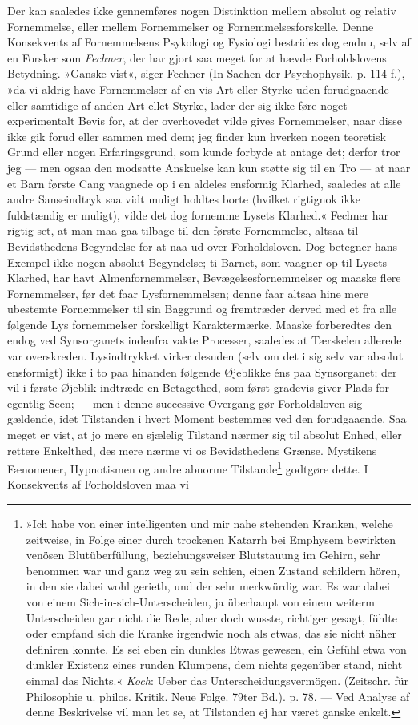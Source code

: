 \documentclass[12pt,a4paper,openany]{book}
\newcommand{\opage}[1]{\marginnote{\footnotesize\textit{[#1]}}}
\begin{document}
Der kan saaledes ikke gennemføres nogen Distinktion mellem absolut og
relativ Fornemmelse, eller mellem Fornemmelser og Fornemmelsesforskelle.
Denne Konsekvents af Fornemmelsens Psykologi og Fysiologi bestrides dog
endnu, selv af en Forsker som \emph{Fechner}, der har gjort saa meget
for at hævde Forholdslovens Betydning. »Ganske vist«, siger Fechner (In
Sachen der Psychophysik. p. 114 f.), »da vi aldrig have Fornemmelser af
en vis Art eller Styrke uden forudgaaende eller samtidige af anden Art
ellet Styrke, lader der sig ikke føre noget experimentalt Bevis for, at
der overhovedet vilde gives Fornemmelser, naar disse ikke gik forud
eller sammen med dem; jeg finder kun hverken nogen teoretisk Grund eller
nogen Erfaringsgrund, som kunde forbyde at antage det; derfor tror jeg
--- men ogsaa den modsatte Anskuelse kan kun støtte sig til en Tro ---
at naar et Barn første Cang vaagnede op i en aldeles ensformig Klarhed,
saaledes at alle andre Sanseindtryk saa vidt muligt holdtes borte
(hvilket rigtignok ikke fuldstændig er muligt), vilde det dog fornemme
Lysets Klarhed.« Fechner har rigtig set, at man maa gaa tilbage til den
første Fornemmelse, altsaa til Bevidsthedens Begyndelse for at naa ud
over Forholdsloven. Dog betegner hans Exempel ikke nogen absolut
Begyndelse; ti Barnet, som vaagner op til Lysets Klarhed, har havt
Almenfornemmelser, Bevægelsesfornemmelser og maaske flere Fornemmelser,
før det faar Lysfornemmelsen; denne faar altsaa hine mere ubestemte
Fornemmelser til sin Baggrund og fremtræder derved med et fra alle
følgende Lys%
\opage{143}fornemmelser forskelligt Karaktermærke. Maaske forberedtes
den endog ved Synsorganets indenfra vakte Processer, saaledes at
Tærskelen allerede var overskreden. Lysindtrykket virker desuden (selv
om det i sig selv var absolut ensformigt) ikke i to paa hinanden
følgende Øjeblikke éns paa Synsorganet; der vil i første Øjeblik
indtræde en Betagethed, som først gradevis giver Plads for egentlig
Seen; --- men i denne successive Overgang gør Forholdsloven sig
gældende, idet Tilstanden i hvert Moment bestemmes ved den forudgaaende.
Saa meget er vist, at jo mere en sjælelig Tilstand nærmer sig til
absolut Enhed, eller rettere Enkelthed, des mere nærme vi os
Bevidsthedens Grænse. Mystikens Fænomener, Hypnotismen og andre abnorme
Tilstande\footnote[1]{»Ich habe von einer intelligenten und mir nahe
stehenden Kranken, welche zeitweise, in Folge einer durch trockenen
Katarrh bei Emphysem bewirkten venösen Blutüberfüllung, beziehungsweiser
Blutstauung im Gehirn, sehr benommen war und ganz weg zu sein schien,
einen Zustand schildern hören, in den sie dabei wohl gerieth, und der
sehr merkwürdig war. Es war dabei von einem Sich-in-sich-Unterscheiden,
ja überhaupt von einem weiterm Unterscheiden gar nicht die Rede, aber
doch wusste, richtiger gesagt, fühlte oder empfand sich die Kranke
irgendwie noch als etwas, das sie nicht näher definiren konnte. Es sei
eben ein dunkles Etwas gewesen, ein Gefühl etwa von dunkler Existenz
eines runden Klumpens, dem nichts gegenüber stand, nicht einmal das
Nichts.« \emph{Koch}: Ueber das Unterscheidungsvermögen. (Zeitschr. für
Philosophie u. philos. Kritik. Neue Folge. 79ter Bd.). p. 78. --- Ved
Analyse af denne Beskrivelse vil man let se, at Tilstanden ej har været
ganske enkelt.} godtgøre dette. I Konsekvents af Forholdsloven maa vi
\end{document}
